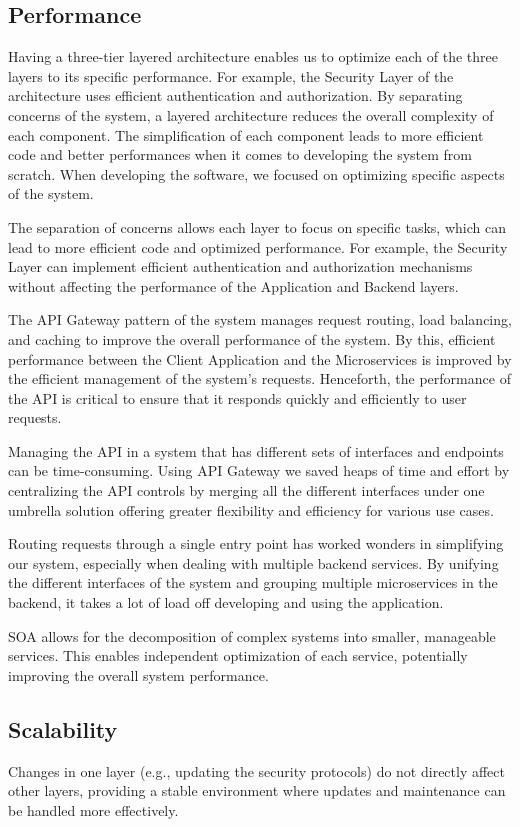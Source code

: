 \documentclass[a4paper,12pt]{article}
\begin{document}
\subsection{Performance}
Having a three-tier layered architecture enables us to optimize each of the three layers to its specific performance. For example, the Security Layer of the architecture uses efficient authentication and authorization. By separating concerns of the system, a layered architecture reduces the overall complexity of each component. The simplification of each component leads to more efficient code and better performances when it comes to developing the system from scratch. When developing the software, we focused on optimizing specific aspects of the system.

The separation of concerns allows each layer to focus on specific tasks, which can lead to more efficient code and optimized performance. For example, the Security Layer can implement efficient authentication and authorization mechanisms without affecting the performance of the Application and Backend layers.

The API Gateway pattern of the system manages request routing, load balancing, and caching to improve the overall performance of the system. By this, efficient performance between the Client Application and the Microservices is improved by the efficient management of the system's requests. Henceforth, the performance of the API is critical to ensure that it responds quickly and efficiently to user requests.

Managing the API in a system that has different sets of interfaces and endpoints can be time-consuming. Using API Gateway we saved heaps of time and effort by centralizing the API controls by merging all the different interfaces under one umbrella solution offering greater flexibility and efficiency for various use cases.

Routing requests through a single entry point has worked wonders in simplifying our system, especially when dealing with multiple backend services. By unifying the different interfaces of the system and grouping multiple microservices in the backend, it takes a lot of load off developing and using the application.

SOA allows for the decomposition of complex systems into smaller, manageable services. This enables independent optimization of each service, potentially improving the overall system performance.

\subsection{Scalability}
Changes in one layer (e.g., updating the security protocols) do not directly affect other layers, providing a stable environment where updates and maintenance can be handled more effectively.
\end{document}
